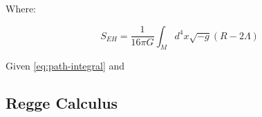 \documentclass{article}
\begin{document}
Where:

\begin{equation}
  \label{eq:einstein-hilbert-action}
  S_{EH}=\frac{1}{16\pi G}\int_{M}d^4 x\sqrt{-g}\left(R-2\Lambda\right)
\end{equation}

Given \eqref{eq:path-integral} and \cite{kommu2011} 

\subsection{Regge Calculus}





\end{document}
